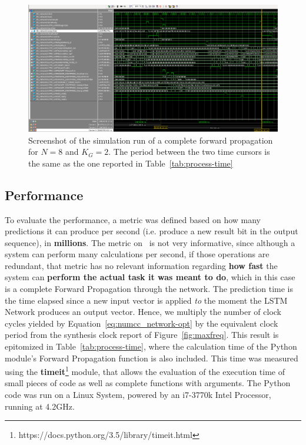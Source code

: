 \begin{figure}
    \centering
    \includegraphics[width=\linewidth]{figures/wave.png}
    \caption[Screenshot of the simulation run of a complete forward propagation for $N=8$ and $K_G=2$]{Screenshot of the simulation run of a complete forward propagation for $N=8$ and $K_G=2$. The period between the two time cursors is the same as the one reported in Table~\ref{tab:process-time}}
    \label{fig:res-meth-wave}
\end{figure}

\subsection{Performance}\label{sec:res-valid-fpps}
To evaluate the performance, a metric was defined based on how many predictions it can produce per second (i.e. produce a new result bit in the output sequence),
in \textbf{millions}. The metric on~\cite{Chang15} is not very informative, since
although a system can perform many calculations per second, if those operations are redundant, that metric has no relevant information
regarding \textbf{how fast} the system can \textbf{perform the actual task it was meant to do}, which in this case is a complete Forward
Propagation through the network. The prediction time is the time elapsed since a new input vector is applied \emph{to} the moment the LSTM
Network produces an output vector. Hence, we multiply the number of clock cycles yielded by Equation~\ref{eq:numcc_network-opt} by the equivalent clock period
from the synthesis clock report of Figure~\ref{fig:maxfreq}.
This result is epitomized in Table~\ref{tab:process-time}, where the calculation time of the Python module's Forward Propagation function is
also included. This time was measured using the \textbf{timeit}\footnote{https://docs.python.org/3.5/library/timeit.html}  module, that allows
the evaluation of the execution time of small pieces of code as well as complete functions with arguments. The Python code was run on a Linux System,
powered by an i7-3770k Intel Processor, running at 4.2GHz.

